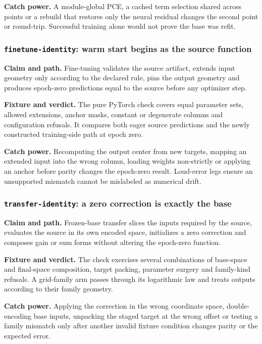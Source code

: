 \documentclass[10pt,aps,prd,twocolumn,nofootinbib]{revtex4-2}
\newcommand{\code}[1]{\texttt{#1}}
\begin{document}
\textbf{Catch power.}  A module-global PCE, a cached term selection shared
across points or a rebuild that restores only the neural residual changes the
second point or round-trip.  Successful training alone would not prove the
base was refit.

\subsubsection{\code{finetune-identity}: warm start begins as the source function}

\textbf{Claim and path.}  Fine-tuning validates the source artifact, extends
input geometry only according to the declared rule, pins the output geometry
and produces epoch-zero predictions equal to the source before any optimizer
step.

\textbf{Fixture and verdict.}  The pure PyTorch check covers equal parameter
sets, allowed extensions, anchor masks, constant or degenerate columns and
configuration refusals.  It compares both eager source predictions and the
newly constructed training-side path at epoch zero.

\textbf{Catch power.}  Recomputing the output center from new targets, mapping
an extended input into the wrong column, loading weights non-strictly or
applying an anchor before parity changes the epoch-zero result.  Loud-error
legs ensure an unsupported mismatch cannot be mislabeled as numerical drift.

\subsubsection{\code{transfer-identity}: a zero correction is exactly the base}

\textbf{Claim and path.}  Frozen-base transfer slices the inputs required by
the source, evaluates the source in its own encoded space, initializes a zero
correction and composes gain or sum forms without altering the epoch-zero
function.

\textbf{Fixture and verdict.}  The check exercises several combinations of
base-space and final-space composition, target packing, parameter surgery
and family-kind refusals.  A grid-family arm passes through its logarithmic
law and treats outputs according to their family geometry.

\textbf{Catch power.}  Applying the correction in the wrong coordinate space,
double-encoding base inputs, unpacking the staged target at the wrong offset
or testing a family mismatch only after another invalid fixture condition
changes parity or the expected error.
\end{document}
